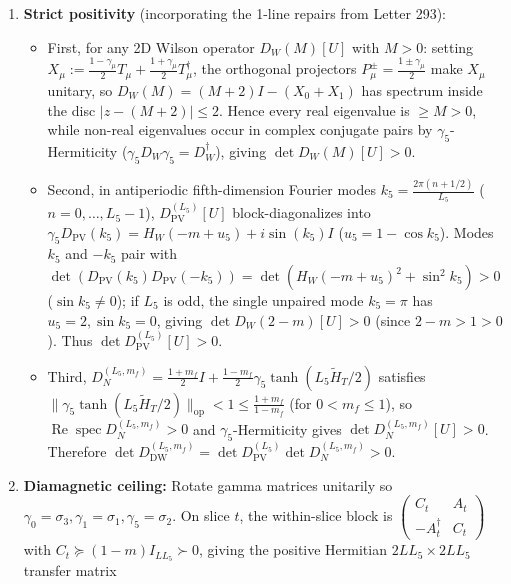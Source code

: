 \documentclass[11pt,a4paper]{article}
\begin{document}
\begin{enumerate}
\item{} {\bfseries\boldmath Strict positivity} (incorporating the 1-line repairs from Letter 293):
\begin{itemize}
\item{} First, for any 2D Wilson operator $D_W(M)[U]$ with $M > 0$: setting $X_\mu := \frac{1-\gamma_\mu}{2} T_\mu + \frac{1+\gamma_\mu}{2} T_\mu^\dagger$, the orthogonal projectors $P_\mu^\pm = \frac{1\pm\gamma_\mu}{2}$ make $X_\mu$ unitary, so $D_W(M) = (M + 2) I - (X_0 + X_1)$ has spectrum inside the disc $|z - (M + 2)| \le 2$. Hence every real eigenvalue is $\ge M > 0$, while non-real eigenvalues occur in complex conjugate pairs by $\gamma_5$-Hermiticity ($\gamma_5 D_W \gamma_5 = D_W^\dagger$), giving $\det D_W(M)[U] > 0$.
\item{} Second, in antiperiodic fifth-dimension Fourier modes $k_5 = \frac{2\pi(n + 1/2)}{L_5}$ ($n = 0, \dots, L_5 - 1$), $D_{\text{PV}}^{(L_5)}[U]$ block-diagonalizes into $\gamma_5 D_{\text{PV}}(k_5) = H_W(-m + u_5) + i\sin(k_5) I$ ($u_5 = 1 - \cos k_5$). Modes $k_5$ and $-k_5$ pair with $\det(D_{\text{PV}}(k_5) D_{\text{PV}}(-k_5)) = \det(H_W(-m + u_5)^2 + \sin^2 k_5) > 0$ ($\sin k_5 \ne 0$); if $L_5$ is odd, the single unpaired mode $k_5 = \pi$ has $u_5 = 2, \sin k_5 = 0$, giving $\det D_W(2 - m)[U] > 0$ (since $2 - m > 1 > 0$). Thus $\det D_{\text{PV}}^{(L_5)}[U] > 0$.
\item{} Third, $D_N^{(L_5, m_f)} = \frac{1+m_f}{2} I + \frac{1-m_f}{2} \gamma_5 \tanh(L_5 \tilde{H}_T/2)$ satisfies $\|\gamma_5 \tanh(L_5 \tilde{H}_T/2)\|_{\text{op}} < 1 \le \frac{1+m_f}{1-m_f}$ (for $0 < m_f \le 1$), so $\operatorname{Re} \operatorname{spec} D_N^{(L_5, m_f)} > 0$ and $\gamma_5$-Hermiticity gives $\det D_N^{(L_5, m_f)}[U] > 0$. Therefore $\det D_{\text{DW}}^{(L_5, m_f)} = \det D_{\text{PV}}^{(L_5)} \det D_N^{(L_5, m_f)} > 0$.
\end{itemize}

\item{} {\bfseries\boldmath Diamagnetic ceiling:} Rotate gamma matrices unitarily so $\gamma_0 = \sigma_3, \gamma_1 = \sigma_1, \gamma_5 = \sigma_2$. On slice $t$, the within-slice block is $\begin{pmatrix} C_t & A_t \\ -A_t^\dagger & C_t \end{pmatrix}$ with $C_t \succeq (1 - m) I_{L L_5} \succ 0$, giving the positive Hermitian $2 L L_5 \times 2 L L_5$ transfer matrix


\end{enumerate}
\end{document}
